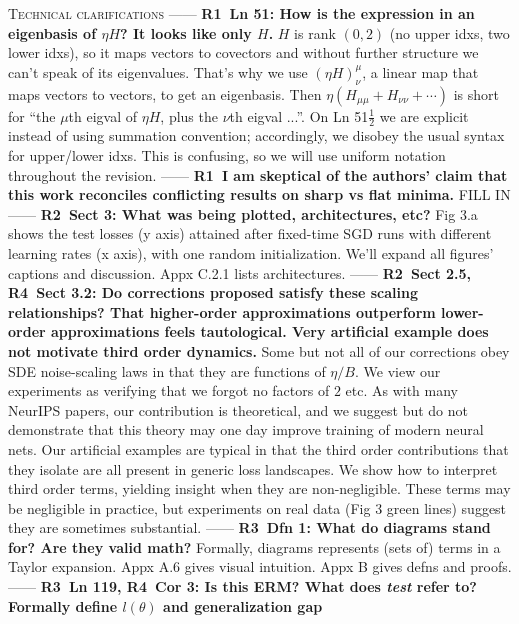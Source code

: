 \documentclass{article}
\newcommand{\Ra}{\textmd{\textsf{\color{brown} {R1}}}}
\newcommand{\Rb}{\textmd{\textsf{\color{green} {R2}}}}
\newcommand{\Rc}{\textmd{\textsf{\color{blue} {R3}}}}
\newcommand{\Rd}{\textmd{\textsf{\color{purple} {R4}}}}
\newcommand{\sct}[1]{\textmd{\textsf{Sect #1}}}
\newcommand{\cor}[1]{\textmd{\textsf{Cor #1}}}
\newcommand{\dfn}[1]{\textmd{\textsf{Dfn #1}}}
\newcommand{\pdx}[1]{\textmd{\textsf{Appx #1}}}
\newcommand{\lin}[1]{\textmd{\textsf{Ln #1}}}
\newcommand{\fig}[1]{\textmd{\textsf{Fig #1}}}
\begin{document}
    \textsc{Technical clarifications}
    ------
    \textbf{\Ra\ \lin{51}: How is the expression in an eigenbasis of $\eta H$?
    It looks like only $H$.} $H$ is rank $(0,2)$ (no upper idxs, two lower
    idxs), so it maps vectors to covectors and without further structure we
    can't speak of its eigenvalues.  That's why we use $(\eta H)^\mu_\nu$, a
    linear map that maps vectors to vectors, to get an eigenbasis.  Then
    $\eta(H_{\mu\mu} + H_{\nu\nu}+\cdots)$ is short for ``the $\mu$th
    eigval of $\eta H$, plus the $\nu$th eigval ...''.  On \lin{51$\frac{1}{2}$} we
    are explicit instead of using summation convention; accordingly, we 
    disobey the usual syntax for upper/lower idxs.  This is confusing, so we
    will use uniform notation throughout the revision.
    ------
    \textbf{\Ra\ I am skeptical of the authors' claim that this work reconciles
    conflicting results on sharp vs flat minima.}
    {\color{red} FILL IN}
    ------
    \textbf{\Rb\ \sct{3}: What was being plotted, architectures, etc?}
    \fig{3.a} shows the test losses (y axis) attained after fixed-time SGD runs
    with different learning rates (x axis), with one random initialization.
    We'll expand all figures' captions and discussion.  \pdx{C.2.1} lists
    architectures.
    ------
    \textbf{\Rb\ \sct{2.5}, \Rd\ \sct{3.2}: Do corrections proposed satisfy
    these scaling relationships?  That higher-order approximations outperform
    lower-order approximations feels tautological.  Very artificial example
    does not motivate third order dynamics.} Some but not all of our
    corrections obey SDE
    noise-scaling laws in that they are functions of $\eta/B$.  We view our
    experiments as verifying that we forgot no factors of $2$ etc.
    As with many NeurIPS papers, our contribution is theoretical, and we
    suggest but do not demonstrate that this theory may one day improve
    training of modern neural nets.  Our artificial examples are typical in that the
    third order contributions that they isolate are all present in generic loss
    landscapes.  We show how to interpret third order terms, yielding insight
    when they are non-negligible.  These terms may be negligible in practice,
    but experiments on real data (\fig{3} green lines) suggest they are sometimes
    substantial.
    ------
    \textbf{\Rc\ \dfn{1}: What do diagrams stand for?  Are they valid math?}
    Formally, diagrams represents (sets of) terms in a Taylor expansion.
    \pdx{A.6} gives visual intuition.  \pdx{B} gives defns and proofs.
    ------
    \textbf{\Rc\ \lin{119}, \Rd\ \cor{3}: Is this ERM? What does \emph{test}
    refer to? Formally define $l(\theta)$ and generalization gap}
\end{document}
